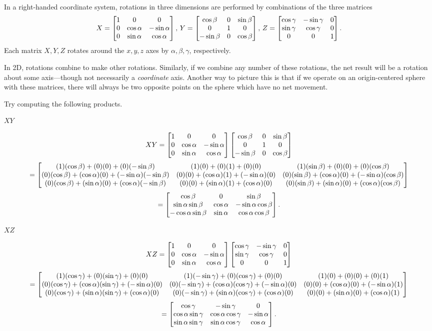 \documentclass[../gatm_answers.tex]{subfiles}
\begin{document}
\begin{outer_problem}
\item In a right-handed coordinate system, rotations in three dimensions are performed by combinations of the three matrices
$$X=\begin{bmatrix} 1 & 0 & 0 \\ 0 & \cos\alpha & -\sin\alpha \\ 0 & \sin\alpha & \cos\alpha \end{bmatrix},\, Y=\begin{bmatrix} \cos\beta & 0 & \sin\beta \\ 0 & 1 & 0 \\ -\sin\beta & 0 & \cos\beta \end{bmatrix},\, Z=\begin{bmatrix} \cos\gamma & -\sin\gamma & 0 \\ \sin\gamma & \cos\gamma & 0 \\ 0 & 0 & 1 \end{bmatrix}.$$
Each matrix $X,Y,Z$ rotates around the $x,y,z$ axes by $\alpha,\beta,\gamma$, respectively.

In 2D, rotations combine to make other rotations. Similarly, if we combine any number of these rotations, the net result will be a rotation about some axis---though not necessarily a \textit{coordinate} axis. Another way to picture this is that if we operate on an origin-centered sphere with these matrices, there will always be two opposite points on the sphere which have no net movement.

Try computing the following products.
\end{outer_problem}

\begin{inner_problem}[start=1]
\item $XY$
\end{inner_problem}

$$XY = \begin{bmatrix} 1 & 0 & 0 \\ 0 & \cos\alpha & -\sin\alpha \\ 0 & \sin\alpha & \cos\alpha \end{bmatrix}\begin{bmatrix} \cos\beta & 0 & \sin\beta \\ 0 & 1 & 0 \\ -\sin\beta & 0 & \cos\beta \end{bmatrix}$$
$$=\begin{bmatrix} (1)(\cos\beta) + (0)(0) + (0)(-\sin\beta) & (1)(0) + (0)(1) + (0)(0) & (1)(\sin\beta) + (0)(0) + (0)(\cos\beta) \\ (0)(\cos\beta) + (\cos\alpha)(0) + (-\sin\alpha)(-\sin\beta) & (0)(0) + (\cos\alpha)(1) + (-\sin\alpha)(0) & (0)(\sin\beta) + (\cos\alpha)(0) + (-\sin\alpha)(\cos\beta) \\ (0)(\cos\beta) + (\sin\alpha)(0) + (\cos\alpha)(-\sin\beta) & (0)(0) + (\sin\alpha)(1) + (\cos\alpha)(0) & (0)(\sin\beta) + (\sin\alpha)(0) + (\cos\alpha)(\cos\beta) \end{bmatrix}$$
$$=\begin{bmatrix} \cos\beta & 0 & \sin\beta \\ \sin\alpha\sin\beta & \cos\alpha & -\sin\alpha\cos\beta \\ -\cos\alpha\sin\beta & \sin\alpha & \cos\alpha\cos\beta \end{bmatrix}.$$

\begin{inner_problem}
\item $XZ$
\end{inner_problem}

$$XZ = \begin{bmatrix} 1 & 0 & 0 \\ 0 & \cos\alpha & -\sin\alpha \\ 0 & \sin\alpha & \cos\alpha \end{bmatrix}\begin{bmatrix} \cos\gamma & -\sin\gamma & 0 \\ \sin\gamma & \cos\gamma & 0 \\ 0 & 0 & 1 \end{bmatrix}$$
$$=\begin{bmatrix} (1)(\cos\gamma) + (0)(\sin\gamma) + (0)(0) & (1)(-\sin\gamma) + (0)(\cos\gamma) + (0)(0) & (1)(0) + (0)(0) + (0)(1) \\ (0)(\cos\gamma) + (\cos\alpha)(\sin\gamma) + (-\sin\alpha)(0) & (0)(-\sin\gamma) + (\cos\alpha)(\cos\gamma) + (-\sin\alpha)(0) & (0)(0) + (\cos\alpha)(0) + (-\sin\alpha)(1) \\ (0)(\cos\gamma) + (\sin\alpha)(\sin\gamma) + (\cos\alpha)(0) & (0)(-\sin\gamma) + (\sin\alpha)(\cos\gamma) + (\cos\alpha)(0) & (0)(0) + (\sin\alpha)(0) + (\cos\alpha)(1) \end{bmatrix}$$
$$=\begin{bmatrix} \cos\gamma & -\sin\gamma & 0 \\ \cos\alpha\sin\gamma & \cos\alpha\cos\gamma & -\sin\alpha \\ \sin\alpha\sin\gamma & \sin\alpha\cos\gamma & \cos\alpha \end{bmatrix}.$$
\end{document}
